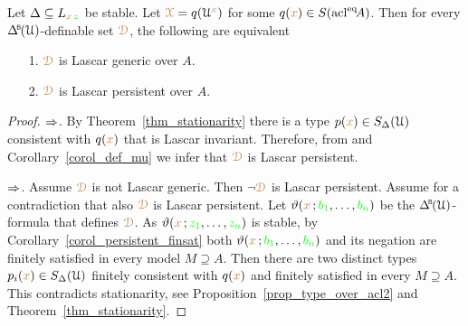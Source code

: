 
\begin{proposition}\label{prop_stable_genericiffpersistent}
  Let $\Delta\subseteq L_{{\color{brown} x}\,{\color{green} z}}$ be stable.
  Let ${\color{brown}\EuScript X}=q(\EuScript U^{\color{brown} x})$ for some $q({\color{brown} x})\in S({\rm acl}^{{\rm eq}}\!A)$.
  Then for every $\BDelta(\U)$-definable set ${\color{brown}\EuScript D}$, the following are equivalent
  \begin{itemize}
    \item[1.] ${\color{brown}\EuScript D}$ is Lascar generic over $A$.
    \item[2.] ${\color{brown}\EuScript D}$ is Lascar persistent over $A$.
  \end{itemize}
\end{proposition}

\begin{proof}
  $\Rightarrow$.
  By Theorem~\ref{thm_stationarity} there is a type $p({\color{brown} x})\in S_\Delta(\EuScript U)$ consistent with $q({\color{brown} x})$ that is Lascar invariant.
  Therefore, from  and Corollary~\ref{corol_def_mu} we infer that ${\color{brown}\EuScript D}$ is Lascar persistent.

  $\Rightarrow$.
  Assume ${\color{brown}\EuScript D}$ is not Lascar generic.
  Then $\neg{\color{brown}\EuScript D}$ is Lascar persistent.
  Assume for a contradiction that also ${\color{brown}\EuScript D}$ is Lascar persistent.
  Let $\vartheta({\color{brown} x}\,;{\color{green} b_1},\dots,{\color{green} b_n})$ be the $\BDelta(\U)$-formula that defines ${\color{brown}\EuScript D}$.
  As $\vartheta({\color{brown} x}\,;{\color{green} z_1},\dots,{\color{green} z_n})$ is stable, by Corollary~\ref{corol_persistent_finsat} both $\vartheta({\color{brown} x}\,;{\color{green} b_1},\dots,{\color{green} b_n})$ and its negation are finitely satisfied in every model $M\supseteq A$.
  Then there are two distinct types $p_i({\color{brown} x})\in S_\Delta(\EuScript U)$ finitely consistent with $q({\color{brown} x})$ and finitely satisfied in every $M\supseteq A$.
  This contradicts stationarity, see Proposition~\ref{prop_type_over_acl2} and Theorem~\ref{thm_stationarity}.
\end{proof}

